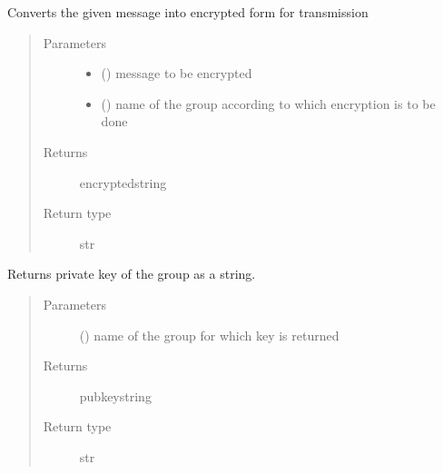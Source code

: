\documentclass[letterpaper,10pt,english]{sphinxmanual}
\begin{document}
\begin{fulllineitems}
\label{\detokenize{grpencrypt:grpencrypt.group_encrypt}}
Converts the given message into encrypted form for transmission
\begin{quote}\begin{description}
\item[{Parameters}] \leavevmode\begin{itemize}
\item {} 
 () \textendash{} message to be encrypted

\item {} 
 () \textendash{} name of the group according to which encryption is to be done

\end{itemize}

\item[{Returns}] \leavevmode
encryptedstring

\item[{Return type}] \leavevmode
str

\end{description}\end{quote}

\end{fulllineitems}


\begin{fulllineitems}
\label{\detokenize{grpencrypt:grpencrypt.private_key_getting}}
Returns private key of the group as a string.
\begin{quote}\begin{description}
\item[{Parameters}] \leavevmode
{} () \textendash{} name of the group for which key is returned

\item[{Returns}] \leavevmode
pubkeystring

\item[{Return type}] \leavevmode
str

\end{description}\end{quote}

\end{fulllineitems}
\end{document}
